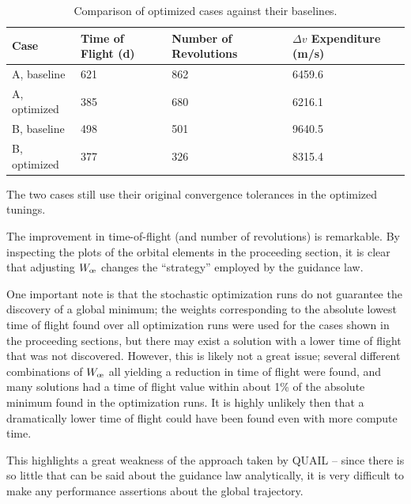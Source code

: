 \begin{table}[H]
    \centering
    \begin{tabular}{L{5cm}L{2.5cm}L{2.5cm}L{3cm}}
        \toprule
        \textbf{Case}                          & Time of Flight (d) & Number of Revolutions & \(\Delta v\) Expenditure (m/s) \\
        \midrule
        A, baseline                            & 621                & 862                   & 6459.6                         \\
        A, optimized  & 385                & 680                   & 6216.1                         \\
        B, baseline                            & 498                & 501                   & 9640.5                         \\
         B, optimized & 377                & 326                   & 8315.4                         \\
        \bottomrule
    \end{tabular}
    \caption{Comparison of optimized cases against their baselines.}
    \label{tab:outputs_2_summary}
\end{table}

The two cases still use their original convergence tolerances in the optimized tunings.

The improvement in time-of-flight (and number of revolutions) is remarkable. By inspecting the plots of the orbital elements in the proceeding section, it is clear that adjusting \(W_\moe\) changes the ``strategy'' employed by the guidance law.

One important note is that the stochastic optimization runs do not guarantee the discovery of a global minimum; the weights corresponding to the absolute lowest time of flight found over all optimization runs were used for the cases shown in the proceeding sections, but there may exist a solution with a lower time of flight that was not discovered. However, this is likely not a great issue; several different combinations of \(W_\moe\) all yielding a reduction in time of flight were found, and many solutions had a time of flight value within about 1\% of the absolute minimum found in the optimization runs. It is highly unlikely then that a dramatically lower time of flight could have been found even with more compute time.

This highlights a great weakness of the approach taken by QUAIL -- since there is so little that can be said about the guidance law analytically, it is very difficult to make any performance assertions about the global trajectory.

